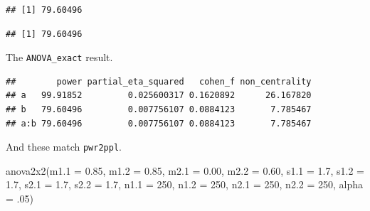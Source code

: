 \documentclass[
]{book}
\newenvironment{Shaded}{\begin{snugshade}}{\end{snugshade}}
\newcommand{\AttributeTok}[1]{\textcolor[rgb]{0.77,0.63,0.00}{#1}}
\newcommand{\ConstantTok}[1]{\textcolor[rgb]{0.00,0.00,0.00}{#1}}
\newcommand{\DecValTok}[1]{\textcolor[rgb]{0.00,0.00,0.81}{#1}}
\newcommand{\FloatTok}[1]{\textcolor[rgb]{0.00,0.00,0.81}{#1}}
\newcommand{\FunctionTok}[1]{\textcolor[rgb]{0.00,0.00,0.00}{#1}}
\newcommand{\NormalTok}[1]{#1}
\newcommand{\OtherTok}[1]{\textcolor[rgb]{0.56,0.35,0.01}{#1}}
\newcommand{\SpecialCharTok}[1]{\textcolor[rgb]{0.00,0.00,0.00}{#1}}
\begin{document}
\begin{verbatim}
## [1] 79.60496
\end{verbatim}

\begin{Shaded}
\end{Shaded}

\begin{verbatim}
## [1] 79.60496
\end{verbatim}

The \texttt{ANOVA\_exact} result.

\begin{Shaded}
\end{Shaded}

\begin{verbatim}
##        power partial_eta_squared   cohen_f non_centrality
## a   99.91852         0.025600317 0.1620892      26.167820
## b   79.60496         0.007756107 0.0884123       7.785467
## a:b 79.60496         0.007756107 0.0884123       7.785467
\end{verbatim}

And these match \texttt{pwr2ppl}.

\begin{Shaded}
\begin{Highlighting}[]
\FunctionTok{anova2x2}\NormalTok{(}\AttributeTok{m1.1 =} \FloatTok{0.85}\NormalTok{, }\AttributeTok{m1.2 =} \FloatTok{0.85}\NormalTok{, }\AttributeTok{m2.1 =} \FloatTok{0.00}\NormalTok{, }\AttributeTok{m2.2 =} \FloatTok{0.60}\NormalTok{,}
         \AttributeTok{s1.1 =} \FloatTok{1.7}\NormalTok{, }\AttributeTok{s1.2 =} \FloatTok{1.7}\NormalTok{, }\AttributeTok{s2.1 =} \FloatTok{1.7}\NormalTok{, }\AttributeTok{s2.2 =} \FloatTok{1.7}\NormalTok{,}
         \AttributeTok{n1.1 =} \DecValTok{250}\NormalTok{, }\AttributeTok{n1.2 =} \DecValTok{250}\NormalTok{, }\AttributeTok{n2.1 =} \DecValTok{250}\NormalTok{, }\AttributeTok{n2.2 =} \DecValTok{250}\NormalTok{,}
         \AttributeTok{alpha =}\NormalTok{ .}\DecValTok{05}\NormalTok{)}
\end{Highlighting}
\end{Shaded}
\end{document}
